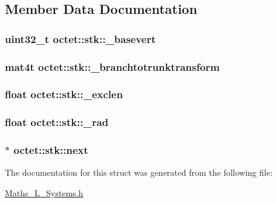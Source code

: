 \subsection{Member Data Documentation}
\hypertarget{structoctet_1_1stk_ae0a1b4ff1ffcce545dbdef793ab339da}{
\subsubsection[{\+\_\+basevert}]{\setlength{\rightskip}{0pt plus 5cm}uint32\+\_\+t octet\+::stk\+::\+\_\+basevert}}\label{structoctet_1_1stk_ae0a1b4ff1ffcce545dbdef793ab339da}
\hypertarget{structoctet_1_1stk_a8374d3134d4d73045c31f022a21c2748}{
\subsubsection[{\+\_\+branchtotrunktransform}]{\setlength{\rightskip}{0pt plus 5cm}mat4t octet\+::stk\+::\+\_\+branchtotrunktransform}}\label{structoctet_1_1stk_a8374d3134d4d73045c31f022a21c2748}
\hypertarget{structoctet_1_1stk_a10f3a3433d85dda46feebf0bca229e02}{
\subsubsection[{\+\_\+exclen}]{\setlength{\rightskip}{0pt plus 5cm}float octet\+::stk\+::\+\_\+exclen}}\label{structoctet_1_1stk_a10f3a3433d85dda46feebf0bca229e02}
\hypertarget{structoctet_1_1stk_aa84c6095af9c2ce6537bde5890fd5231}{
\subsubsection[{\+\_\+rad}]{\setlength{\rightskip}{0pt plus 5cm}float octet\+::stk\+::\+\_\+rad}}\label{structoctet_1_1stk_aa84c6095af9c2ce6537bde5890fd5231}
\hypertarget{structoctet_1_1stk_aa2ba0a1b75f1f0725a21d7cfab94db76}{
\subsubsection[{next}]{$\ast$ octet\+::stk\+::next}}\label{structoctet_1_1stk_aa2ba0a1b75f1f0725a21d7cfab94db76}


The documentation for this struct was generated from the following file\+:\begin{DoxyCompactItemize}
\item 
\hyperlink{_maths___l___systems_8h}{Maths\+\_\+\+L\+\_\+\+Systems.\+h}\end{DoxyCompactItemize}

